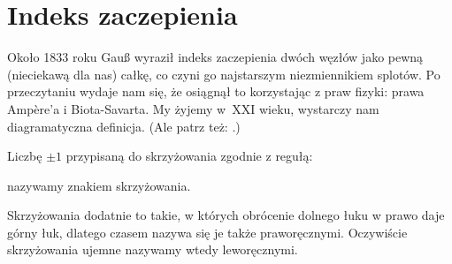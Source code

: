 
\section{Indeks zaczepienia}
%
Około 1833 roku Gauß wyraził indeks zaczepienia dwóch węzłów jako pewną (nieciekawą dla nas) całkę, co czyni go najstarszym niezmiennikiem splotów.
%
Po przeczytaniu \cite{colberg2013} wydaje nam się, że osiągnął to korzystając z praw fizyki: prawa Ampère'a i Biota-Savarta.
My żyjemy w~XXI wieku, wystarczy nam diagramatyczna definicja.
(Ale patrz też: \cite[s. 11]{kawauchi1996}.)

\begin{definition}[znak]
%
    Liczbę $\pm 1$ przypisaną do skrzyżowania zgodnie z regułą:
\begin{comment}
    \setlength{\intextsep}{4pt plus 2pt minus 2pt}
    \begin{figure}[H]
        \begin{minipage}[b]{.48\linewidth}
            \[
                \sign \left( \MedLarPlusCrossingArrows \right) = +1
            \]
        \end{minipage}
        \begin{minipage}[b]{.48\linewidth}
            \[
                \sign \left( \MedLarMinusCrossingArrows \right) = -1
            \]
        \end{minipage}

    \end{figure}
\end{comment}
\noindent
    nazywamy znakiem skrzyżowania.
\end{definition}

Skrzyżowania dodatnie to takie, w których obrócenie dolnego łuku w prawo daje górny łuk, dlatego czasem nazywa się je także praworęcznymi.
Oczywiście skrzyżowania ujemne nazywamy wtedy leworęcznymi.
%
%

